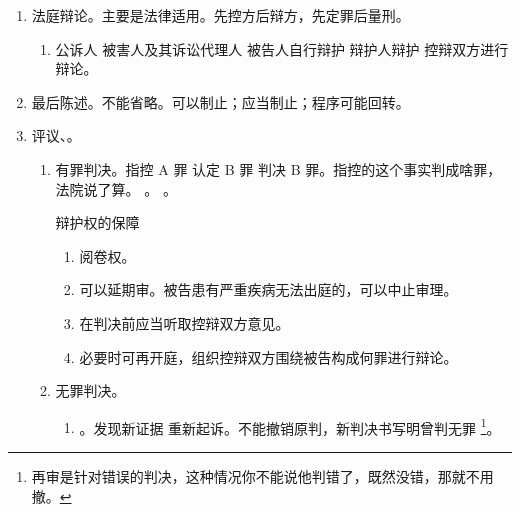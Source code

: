 \begin{enumerate}
\begin{enumerate}
\begin{enumerate}
\begin{enumerate}
                          \item 合议庭调查核实证据。
                          \item 对量刑事实、证据的调查。
                          \item 对查扣冻财物的调查。
                        \end{enumerate}
                \end{enumerate}
          \item 法庭辩论。主要是法律适用。先控方后辩方，先定罪后量刑。
                \begin{enumerate}
                  \item 公诉人 \yjt 被害人及其诉讼代理人 \yjt 被告人自行辩护 \yjt 辩护人辩护 \yjt 控辩双方进行辩论。
                \end{enumerate}
          \item 最后陈述。不能省略。可以制止；应当制止；程序可能回转。
          \item 评议、。
                \begin{enumerate}
                  \item 有罪判决。指控 A 罪 \yjt 认定 B 罪 \yjt 判决 B 罪。指控的这个事实判成啥罪，法院说了算。
                        。
                        。
                        \begin{kk}{辩护权的保障}
                          \begin{enumerate}
                            \item 阅卷权。
                            \item 可以延期审。被告患有严重疾病无法出庭的，可以中止审理。
                            \item 在判决前应当听取控辩双方意见。
                            \item 必要时可再开庭，组织控辩双方围绕被告构成何罪进行辩论。
                          \end{enumerate}
                        \end{kk}
                  \item 无罪判决。
                        \begin{enumerate}
                          \item {}。发现新证据 \yjt 重新起诉。不能撤销原判，新判决书写明曾判无罪
                                \footnote{再审是针对错误的判决，这种情况你不能说他判错了，既然没错，那就不用撤。}。

\end{enumerate}
\end{enumerate}
\end{enumerate}
\end{enumerate}
